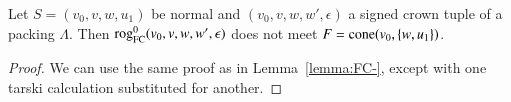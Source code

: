 \begin{lemma}
Let $S=(v_0,v,w,u_1)$ be normal and $(v_0,v,w,w',\epsilon)$ a signed crown tuple
of a packing $\Lambda$.  
Then
${\operatorname{rog}}^0_{\text{FC}}(v_0,v,w,w',\epsilon)$
does not meet $F={\operatorname{cone}}(v_0,\{w,u_1\})$.
\end{lemma}

\begin{proof}  We can use the same proof as in Lemma~\ref{lemma:FC-},
except with one tarski calculation 
substituted for 
another.
\end{proof}


%
%
%
%
